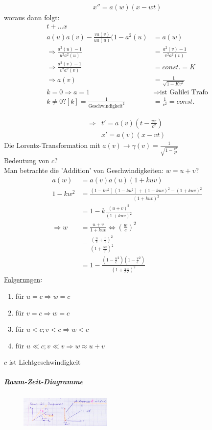 \begin{description}
\begin{enumerate}
\begin{align*}
x''=a(w)(x-wt)
\end{align*}
woraus dann folgt:
\begin{align*}
[a(u)a(v)-\frac{va(v)}{ua(u)}			&(1-a^2(u)]t+...x \\
a(u)a(v)-\frac{va(v)}{ua(u)}(1-a^2(u) 	&=a(w)\\
\Rightarrow\frac{a^2(u)-1}{u^2a^2(u)} 	&=\frac{a^2(v)-1}{v^2a^2(v)}\\
\Rightarrow \frac{a^2(v)-1}{v^2a^2(v)} 	&=const.=K \\
\Rightarrow a(v) 						&=\frac{1}{\sqrt{1-Kv^2}}\\
 k=0\Rightarrow a=1 						&\Rightarrow \text{ist Galilei Trafo}\\
 k\neq 0? [k]=\frac{1}{\text{Geschwindigkeit}^2} &=\frac{1}{c^2}=const.
\end{align*}

\begin{align*}
 \Rightarrow &t'=a(v)(t-\frac{vx}{c^2})\\
 &x'=a(v)(x-vt)
\end{align*}
Die Lorentz-Transformation mit $a(v)\rightarrow \gamma(v)=\frac{1}{\sqrt{1-\frac{v^2}{c^2}}}$\\
Bedeutung von $c$?\\
Man betrachte die 'Addition' von Geschwindigkeiten: $w=u+v$?
\begin{align*}
a(w)		&=a(v)a(u)(1+kuv)\\
1-kw^2	&=\frac{(1-kv^2)(1-ku^2)+(1+kuv)^2-(1+kuv)^2}{(1+kuv)^2}\\
		&=1-k\frac{(u+v)^2}{(1+kuv)^2}\\
\Rightarrow w	&=\frac{u+v}{1+kuv}\Leftrightarrow(\frac{w}{c})^2\\
		&=\frac{(\frac{u}{c}+\frac{v}{c})^2}{(1+\frac{uv}{c^2})^2}\\
		&=1-\frac{(1-\frac{u}{c}^2)(1-\frac{v}{c}^2)}{(1+\frac{u}{c}\frac{v}{c})^2}
\end{align*}
\underline{Folgerungen}:
\begin{enumerate}
\item für $u=c\Rightarrow w=c$
\item für $v=c\Rightarrow w=c$
\item für $u<c; v<c \Rightarrow w<c$
\item für $u\ll c; v\ll v \Rightarrow w\approx u+v$
\end{enumerate}
$c$ ist Lichtgeschwindigkeit
\end{enumerate}
\subparagraph*{Raum-Zeit-Diagramme}
\begin{figure}[h]
\begin{center}
\includegraphics[width=0.4\textwidth]{Skizzen/Anhang3Kopie.jpg}
\end{center}
\caption{}
\end{figure}
\end{description}